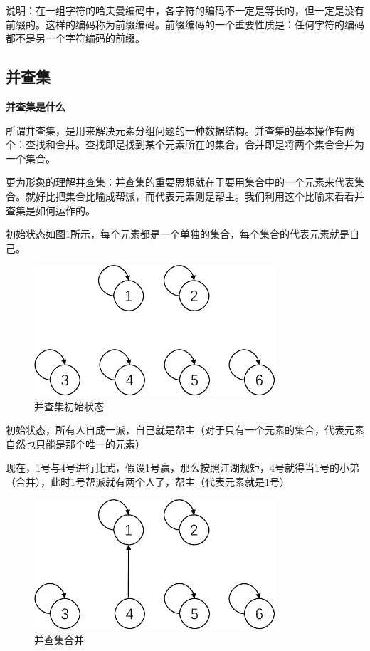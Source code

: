 \documentclass[lang=cn,newtx,10pt,scheme=chinese]{elegantbook}
\begin{document}
说明：在一组字符的哈夫曼编码中，各字符的编码不一定是等长的，但一定是没有前缀的。这样的编码称为前缀编码。前缀编码的一个重要性质是：任何字符的编码都不是另一个字符编码的前缀。
\subsection{并查集}

\textbf{并查集是什么}

所谓并查集，是用来解决元素分组问题的一种数据结构。并查集的基本操作有两个：查找和合并。查找即是找到某个元素所在的集合，合并即是将两个集合合并为一个集合。

更为形象的理解并查集：并查集的重要思想就在于要用集合中的一个元素来代表集合。就好比把集合比喻成帮派，而代表元素则是帮主。我们利用这个比喻来看看并查集是如何运作的。

初始状态如图\ref{fig:unionFind1}所示，每个元素都是一个单独的集合，每个集合的代表元素就是自己。

\begin{figure}[h!]
  \centering
  \includegraphics[width=0.8\textwidth]{./figure/pdf/cropped/unionFindExample(a).pdf}
  \caption{并查集初始状态}
  \label{fig:unionFind1}
\end{figure}

初始状态，所有人自成一派，自己就是帮主（对于只有一个元素的集合，代表元素自然也只能是那个唯一的元素）

现在，1号与4号进行比武，假设1号赢，那么按照江湖规矩，4号就得当1号的小弟（合并），此时1号帮派就有两个人了，帮主（代表元素就是1号）

\begin{figure}[h!]
  \centering
  \includegraphics[width=0.8\textwidth]{./figure/pdf/cropped/unionFindExample(b).pdf}
  \caption{并查集合并}
  \label{fig:unionFind2}
\end{figure}
\end{document}
